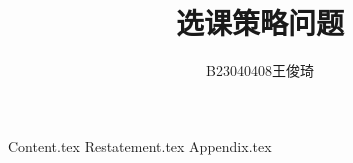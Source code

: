 \documentclass{article}     %
\title{选课策略问题}
\author{B23040408王俊琦}
\begin{document}
{Content.tex}
{Restatement.tex}
{Appendix.tex}
\end{document}
